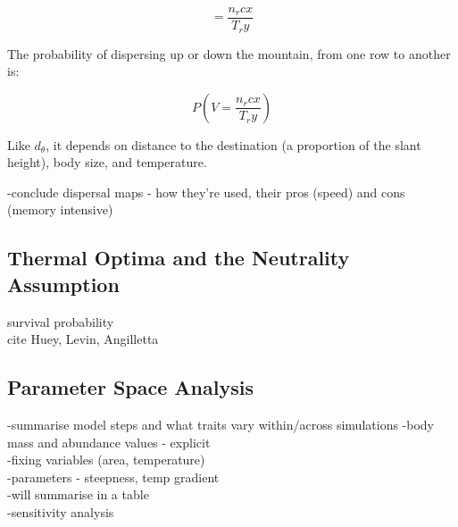 \documentclass[11pt]{article}
\begin{document}
$$= \frac{n_r cx}{T_r y}$$

The probability of dispersing up or down the mountain, from one row to another is:

$$P(V = \frac{n_r cx}{T_r y})$$

Like $d_\theta$, it depends on distance to the destination (a proportion of the slant height), body size, and temperature.

-conclude dispersal maps - how they're used, their pros (speed) and cons (memory intensive)

\subsection{Thermal Optima and the Neutrality Assumption}
survival probability\\
cite Huey, Levin, Angilletta\\

\subsection{Parameter Space Analysis}
-summarise model steps and what traits vary within/across simulations
-body mass and abundance values - explicit\\
-fixing variables (area, temperature)\\
-parameters - steepness, temp gradient\\
-will summarise in a table\\
-sensitivity analysis
\end{document}
